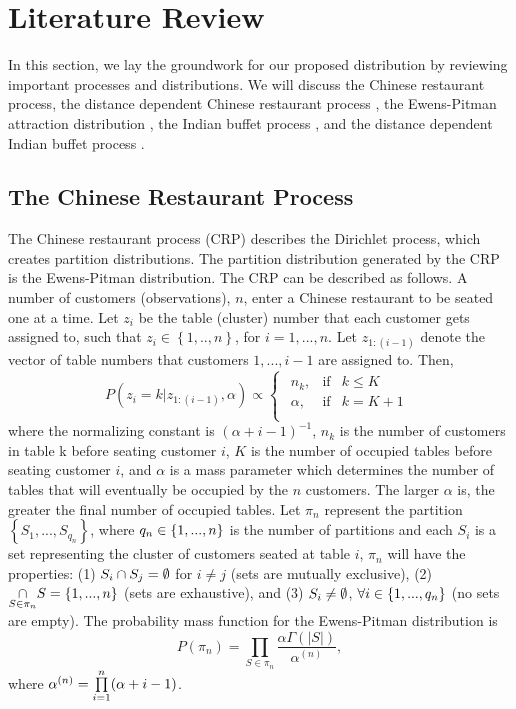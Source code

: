 
\chapter{Literature Review} %
In this section, we lay the groundwork for our proposed distribution by reviewing
important processes and distributions. We will discuss the Chinese restaurant
process, the distance dependent Chinese restaurant process \citep{ddcrp}, the
Ewens-Pitman attraction distribution \citep{epa}, the Indian buffet process
\citep{ibp}, and the distance dependent Indian buffet process \citep{ddibp}.

\section{The Chinese Restaurant Process}
The Chinese restaurant process (CRP) describes the Dirichlet process, which
creates partition distributions. The partition distribution generated by the
CRP is the Ewens-Pitman distribution. The CRP can be described as follows.  A
number of customers (observations), $n$, enter a Chinese restaurant to be
seated one at a time. Let $z_i$ be the table (cluster) number that each
customer gets assigned to, such that $z_i \in \left\{ 1,..,n \right\}$, for $i
= 1,...,n$. Let $z_{1:(i-1)}$ denote the vector of table numbers that customers
$1,...,i-1$ are assigned to. Then,
\begin{equation}
  P(z_i=k|z_{1:(i-1)},\alpha) \propto 
  \begin{cases}
    \begin{array}{rll}
      n_k,    & \text{if} & k \le K\\
      \alpha, & \text{if} & k = K+1\\
    \end{array}
  \end{cases}
\end{equation}
where the normalizing constant is ${(\alpha+i-1)}^{-1}$, $n_k$ is the number of
customers in table k before seating customer $i$, $K$ is the number of occupied
tables before seating customer $i$, and $\alpha$ is a mass parameter which
determines the number of tables that will eventually be occupied by the $n$
customers. The larger $\alpha$ is, the greater the final number of occupied
tables.  Let $\pi_n$ represent the partition $\left\{S_1,...,S_{q_n}\right\}$,
where $q_n \in \left \{1,...,n\right \}$ is the number of partitions and each $S_i$ is a
set representing the cluster of customers seated at table $i$, $\pi_n$ will have
the properties: (1) $S_i \cap S_j = \emptyset$ for $i \ne j$ (sets are mutually
exclusive), (2) $\underset{S \in \pi_n}{\cap} S = \left \{ 1,...,n \right \}$ (sets are
exhaustive), and (3) $S_i \ne \emptyset$, $\forall i \in \left \{ 1,...,q_n\right \}$ (no sets
are empty).  The probability mass function for the Ewens-Pitman distribution is
\begin{equation}
  P(\pi_n) = \underset{S \in \pi_n}{\prod} 
             \frac{\alpha\Gamma(|S|)}{\alpha^{(n)}},
\end{equation}
where $\alpha^{(n)} = \prod\limits_{i=1}^{n}(\alpha+i-1)$.

